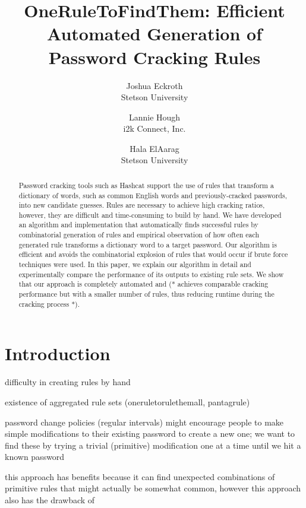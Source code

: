 \documentclass[letterpaper,twocolumn,10pt]{article}
\begin{document}
\date{}

\title{\Large \bf OneRuleToFindThem: Efficient Automated Generation of Password Cracking Rules}

\author{
{\rm Joshua Eckroth}\\
Stetson University
\and
{\rm Lannie Hough}\\
i2k Connect, Inc.
\and
{\rm Hala ElAarag}\\
Stetson University
}

\maketitle

\begin{abstract}
Password cracking tools such as Hashcat support the use of rules that transform
a dictionary of words, such as common English words and previously-cracked
passwords, into new candidate guesses. Rules are necessary to achieve high
cracking ratios, however, they are difficult and time-consuming to build by hand. We have
developed an algorithm and implementation that automatically finds successful
rules by combinatorial generation of rules and empirical observation of how
often each generated rule transforms a dictionary word to a target password.
Our algorithm is efficient and avoids the combinatorial explosion of rules that
would occur if brute force techniques were used. In this paper, we explain our
algorithm in detail and experimentally compare the performance of its outputs to
existing rule sets. We show that our approach is completely automated and
(* achieves comparable cracking performance but with a smaller number of rules,
thus reducing runtime during the cracking process *).
\end{abstract}


\section{Introduction}

difficulty in creating rules by hand

existence of aggregated rule sets (oneruletorulethemall, pantagrule)

password change policies (regular intervals) might encourage people to make
simple modifications to their existing password to create a new one; we want
to find these by trying a trivial (primitive) modification one at a time until
we hit a known password

this approach has benefits because it can find unexpected combinations of
primitive rules that might actually be somewhat common, however this approach
also has the drawback of
\end{document}
